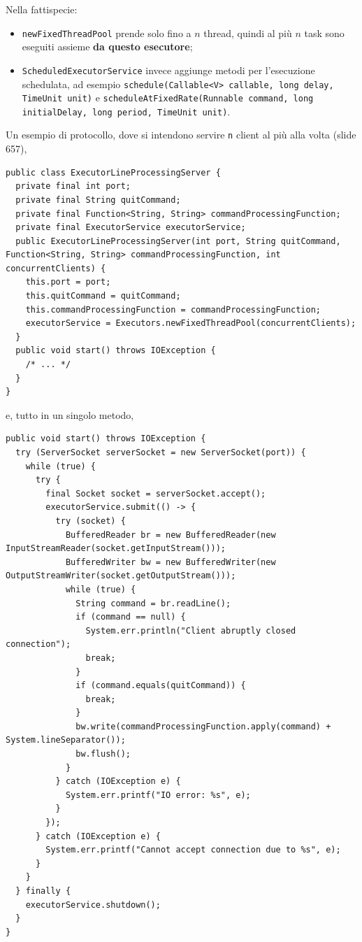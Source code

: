 \documentclass[\fontsizeclass,twocolumn]{\classname}
\theoremstyle{definition}
\theoremstyle{definition}
\begin{document}
Nella fattispecie:
\begin{itemize}
    \item \texttt{newFixedThreadPool} prende solo fino a $n$ thread, quindi al
        più $n$ task sono eseguiti assieme \textbf{da questo esecutore};
    \item \texttt{ScheduledExecutorService} invece aggiunge metodi per
        l'esecuzione schedulata, ad esempio \texttt{schedule(Callable<V>
        callable, long delay, TimeUnit unit)} e
        \texttt{scheduleAtFixedRate(Runnable command, long initialDelay, long
        period, TimeUnit unit)}.
\end{itemize}

Un esempio di protocollo, dove si intendono servire \texttt{n} client al più
alla volta (slide 657),

\begin{lstlisting}
public class ExecutorLineProcessingServer {
  private final int port;
  private final String quitCommand;
  private final Function<String, String> commandProcessingFunction;
  private final ExecutorService executorService;
  public ExecutorLineProcessingServer(int port, String quitCommand, Function<String, String> commandProcessingFunction, int concurrentClients) {
    this.port = port;
    this.quitCommand = quitCommand;
    this.commandProcessingFunction = commandProcessingFunction;
    executorService = Executors.newFixedThreadPool(concurrentClients);
  }
  public void start() throws IOException {
    /* ... */
  }
}
\end{lstlisting}

e, tutto in un singolo metodo,

\begin{lstlisting}
public void start() throws IOException {
  try (ServerSocket serverSocket = new ServerSocket(port)) {
    while (true) {
      try {
        final Socket socket = serverSocket.accept();
        executorService.submit(() -> {
          try (socket) {
            BufferedReader br = new BufferedReader(new InputStreamReader(socket.getInputStream()));
            BufferedWriter bw = new BufferedWriter(new OutputStreamWriter(socket.getOutputStream()));
            while (true) {
              String command = br.readLine();
              if (command == null) {
                System.err.println("Client abruptly closed connection");
                break;
              }
              if (command.equals(quitCommand)) {
                break;
              }
              bw.write(commandProcessingFunction.apply(command) + System.lineSeparator());
              bw.flush();
            }
          } catch (IOException e) {
            System.err.printf("IO error: %s", e);
          }
        });
      } catch (IOException e) {
        System.err.printf("Cannot accept connection due to %s", e);
      }
    }
  } finally {
    executorService.shutdown();
  }
}
\end{lstlisting}
\end{document}
